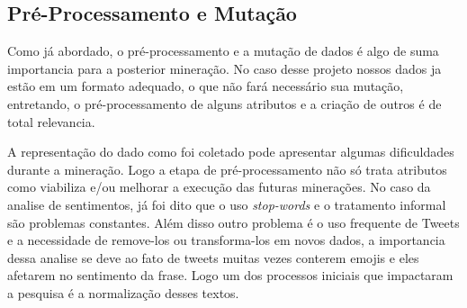 \subsection{Pré-Processamento e Mutação}
Como já abordado, o pré-processamento e a mutação de dados é algo de suma importancia para a posterior mineração. No caso desse projeto nossos dados ja estão em um formato adequado, o que não fará necessário sua mutação, entretando, o pré-processamento de alguns atributos e a criação de outros é de total relevancia.

A representação do dado como foi coletado pode apresentar algumas dificuldades durante a mineração. Logo a etapa de pré-processamento não só trata atributos como viabiliza e/ou melhorar a execução das futuras minerações. No caso da analise de sentimentos, já foi dito que o uso \textit{stop-words} e o tratamento informal são problemas constantes. Além disso outro problema é o uso frequente de Tweets e a necessidade de remove-los ou transforma-los em novos dados, a importancia dessa analise se deve ao fato de tweets muitas vezes conterem emojis e eles afetarem no sentimento da frase\cite{novak2015sentiment}. Logo um dos processos iniciais que impactaram a pesquisa é a normalização desses textos.
